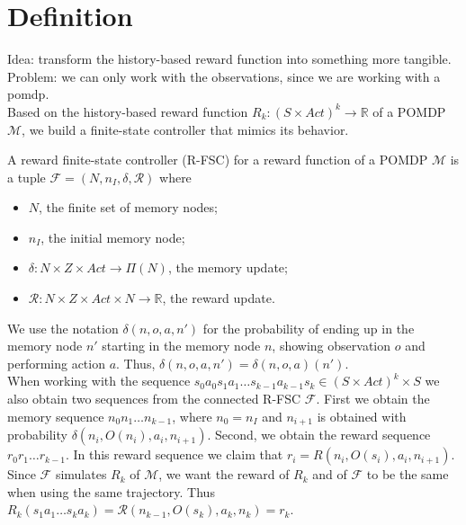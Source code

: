 \section{Definition}
Idea: transform the history-based reward function into something more tangible. Problem: we can only work with the observations, since we are working with a pomdp.\\


Based on the history-based reward function $R_k:(S\times Act)^k\to\mathbb{R}$ of a POMDP $\mathcal{M}$, we build a finite-state controller that mimics its behavior.

\begin{definition}
	A reward finite-state controller (R-FSC) for a reward function of a POMDP $\mathcal{M}$ is a tuple $\mathcal{F}=(N,n_I,\delta,\mathcal{R})$ where
	\begin{itemize}
		\item $N$, the finite set of memory nodes;
		\item $n_I$, the initial memory node;
		\item $\delta: N \times Z \times Act \to \Pi(N)$, the memory update;
		\item $\mathcal{R}: N \times Z \times Act\times N \to \mathbb{R}$, the reward update. 
	\end{itemize}
\end{definition}


We use the notation $\delta(n,o,a,n')$ for the probability of ending up in the memory node $n'$ starting in the memory node $n$, showing observation $o$ and performing action $a$. Thus, $\delta(n,o,a,n')=\delta(n,o,a)(n') $.\\

When working with the sequence $s_0 a_0 s_1 a_1 \dots s_{k-1} a_{k-1} s_k\in(S\times Act)^k\times S$ we also obtain two sequences from the connected R-FSC $\mathcal{F}$. First we obtain the memory sequence $n_0 n_1 \dots n_{k-1}$, where $n_0=n_I$ and $n_{i+1}$ is obtained with probability $\delta(n_i,O(n_i),a_i,n_{i+1})$. Second, we obtain the reward sequence $r_0 r_1 \dots r_{k-1}$. In this reward sequence we claim that $r_i=R(n_i,O(s_i),a_i,n_{i+1})$. \\

Since $\mathcal{F}$ simulates $R_k$ of $\mathcal{M}$, we want the reward of $R_k$ and of $\mathcal{F}$ to be the same when using the same trajectory. Thus $R_k(s_1 a_1 \dots s_{k} a_{k}) = \mathcal{R}(n_{k-1},O(s_{k}),a_{k},n_{k}) = r_{k}$.\\

